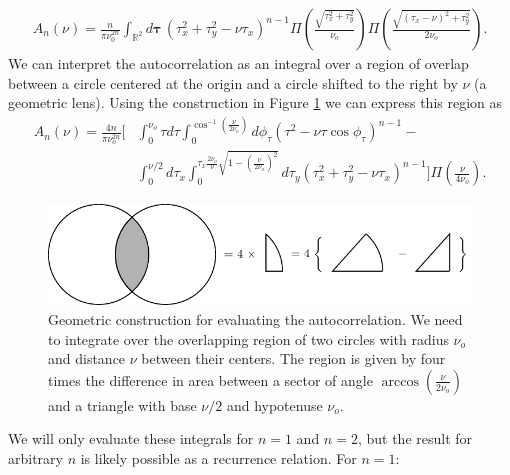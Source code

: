 \documentclass[]{osa-article}
\providecommand{\mbb}[1]{\mathbb{#1}}
\providecommand{\bs}[1]{\boldsymbol{#1}}
\begin{document}
\begin{align}
  A_n(\nu) = \frac{n}{\pi \nu_0^{2n}}\int_{\mbb{R}^2}d\bs{\tau}\, (\tau_x^2 + \tau_y^2 - \nu\tau_x)^{n-1}\Pi\left(\frac{\sqrt{\tau_x^2 + \tau_y^2}}{\nu_o}\right)\Pi\left(\frac{\sqrt{(\tau_x - \nu)^2 + \tau_y^2}}{2\nu_o}\right).
\end{align}
We can interpret the autocorrelation as an integral over a region of overlap
between a circle centered at the origin and a circle shifted to the right by
$\nu$ (a geometric lens). Using the construction in Figure \ref{fig:geometry} we
can express this region as
\begin{align}
  A_n(\nu) = \frac{4n}{\pi\nu_o^{2n}}\Bigg[&\int_0^{\nu_o}\tau d\tau\int_0^{\cos^{-1}\left(\frac{\nu}{2\nu_o}\right)}d\phi_{\tau}(\tau^2 - \nu\tau\cos\phi_{\tau})^{n-1} -\nonumber \\ &\int_{0}^{\nu/2}d\tau_x\int_0^{\tau_x\frac{2\nu_o}{\nu}\sqrt{1 - \left(\frac{\nu}{2\nu_o}\right)^2}}d\tau_y(\tau_x^2 + \tau_y^2 - \nu\tau_x)^{n-1}\Bigg]\Pi\left(\frac{\nu}{4\nu_o}\right).
\end{align}
\begin{figure}[h]
 \centering
   \centering
   \includegraphics[width = 1.0\textwidth]{../figures/autocorrelation/autocorrelation.pdf}
   \caption{Geometric construction for evaluating the autocorrelation. We need
     to integrate over the overlapping region of two circles with radius $\nu_o$
     and distance $\nu$ between their centers. The region is given by four times
     the difference in area between a sector of angle
     $\arccos\left(\frac{\nu}{2\nu_o}\right)$ and a triangle with base $\nu/2$
     and hypotenuse $\nu_o$.}
   \label{fig:geometry}
 \end{figure}

 We will only evaluate these integrals for $n=1$ and $n=2$, but the result for
 arbitrary $n$ is likely possible as a recurrence relation. For $n=1$:
\end{document}
